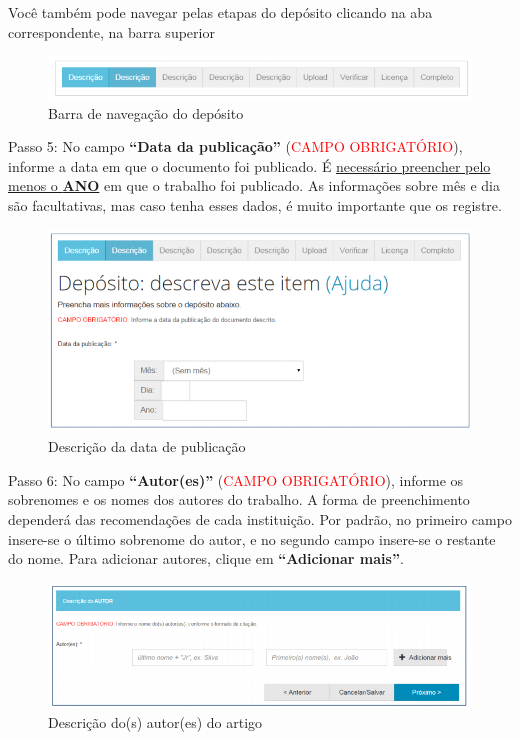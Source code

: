 \documentclass[12pt,hidelinks]{article}
\begin{document}
    Você também pode navegar pelas etapas do depósito clicando na aba correspondente, na barra superior
    
    \begin{figure}[!htp]
                \centering
                \includegraphics[scale=0.8]{figura/Figura142.png}
                \caption{Barra de navegação do depósito}
            \label{Rotulo}
        \end{figure}
    
    Passo 5: No campo \textbf{“Data da publicação”} (\textcolor{red}{CAMPO OBRIGATÓRIO}), informe a data em que o documento foi publicado. É \underline{necessário preencher pelo menos o \textbf{ANO}} em que o trabalho foi publicado. As informações sobre mês e dia são facultativas, mas caso tenha esses dados, é muito importante que os registre. 
    
    \begin{figure}[!htp]
                \centering
                \includegraphics[scale=0.8]{figura/Figura143.png}
                \caption{Descrição da data de publicação}
            \label{Rotulo}
        \end{figure}

\newpage

    Passo 6: No campo \textbf{“Autor(es)”} (\textcolor{red}{CAMPO OBRIGATÓRIO}), informe os sobrenomes e os nomes dos autores do trabalho. A forma de preenchimento dependerá das recomendações de cada instituição. Por padrão, no primeiro campo insere-se o último sobrenome do autor, e no segundo campo insere-se o restante do nome. Para adicionar autores, clique em \textbf{“Adicionar mais”}.
    
    \begin{figure}[!htp]
                \centering
                \includegraphics[scale=0.8]{figura/Figura144.png}
                \caption{Descrição do(s) autor(es) do artigo}
            \label{Rotulo}
        \end{figure}
    
\end{document}
